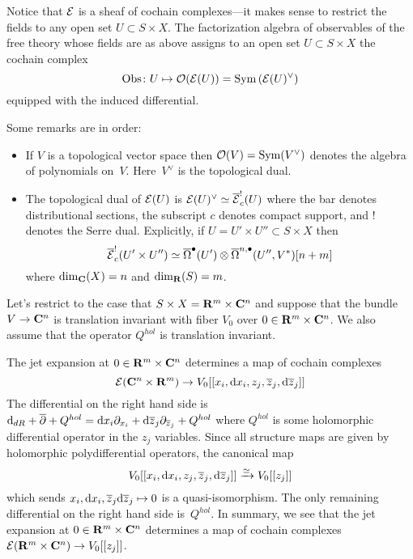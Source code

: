 Notice that $\mathcal E$ is a sheaf of cochain complexes---it makes sense to restrict the fields to any open set $U \subset S \times X$. 
The factorization algebra of observables of the free theory whose fields are as above assigns to an open set $U \subset S \times X$ the cochain complex
\[
\operatorname{Obs} \colon U \mapsto \mathcal O(\mathcal E(U)) = \operatorname{Sym} \left(\mathcal E(U)^\vee \right) 
\]
equipped with the induced differential.

Some remarks are in order:
\begin{itemize}
\item If $V$ is a topological vector space then $\mathcal O(V) = \operatorname{Sym}(V^\vee)$ denotes the algebra of polynomials on~$V$.
Here~$V^\vee$ is the topological dual.
\item The topological dual of $\mathcal E(U)$ is $\mathcal E(U)^\vee \simeq \overline{\mathcal E}^!_c(U)$ where the bar denotes distributional sections, the subscript $c$ denotes compact support, and $!$ denotes the Serre dual. 
Explicitly, if $U = U' \times U'' \subset S \times X$ then 
\[
\overline{\mathcal E}^!_c(U' \times U'') \simeq \overline{\Omega}^\bullet(U') \otimes \overline{\Omega}^{n,\bullet}(U'',V^*)[n+m] 
\]
where $\dim_{\mathbf{C}} (X) = n$ and $\dim_{\mathbf{R}} (S) = m$. 
\end{itemize}

Let's restrict to the case that $S \times X = \mathbf{R}^m \times \mathbf{C}^n$ and suppose that the bundle $V \to \mathbf{C}^n$ is translation invariant with fiber $V_0$ over $0 \in \mathbf{R}^m \times \mathbf{C}^n$.
We also assume that the operator $Q^{hol}$ is translation invariant.   
 
The jet expansion at $0 \in \mathbf{R}^m \times \mathbf{C}^n$ determines a map of cochain complexes
\[
\mathcal E(\mathbf{C}^n \times \mathbf{R}^m) \to V_0 [[x_i, {\rm d} x_i,z_j, \overline{z}_j, {\rm d} \overline{z}_j]] 
\]
The differential on the right hand side is ${\rm d}_{dR} + \overline{\partial} + Q^{hol} = {\rm d} x_i \partial_{x_i} + {\rm d} \overline{z}_j \partial_{\overline{z}_j} + Q^{hol}$ where $Q^{hol}$ is some holomorphic differential operator in the $z_j$ variables. 
Since all structure maps are given by holomorphic polydifferential operators, the canonical map 
\[
V_0 [[x_i, {\rm d} x_i,z_j, \overline{z}_j, {\rm d} \overline{z}_j]] \xrightarrow{\simeq} V_0 [[z_j]] 
\]
which sends $x_i, {\rm d} x_i,\overline{z}_j {\rm d} \overline{z}_j \mapsto 0$ is a quasi-isomorphism. 
The only remaining differential on the right hand side is~$Q^{hol}$. 
In summary, we see that the jet expansion at $0 \in \mathbf{R}^m \times \mathbf{C}^n$ determines a map of cochain complexes $\mathcal E(\mathbf{R}^m \times \mathbf{C}^n) \to V_0[[z_j]]$. 

